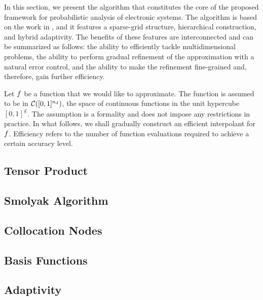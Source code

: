 In this section, we present the algorithm that constitutes the core of the
proposed framework for probabilistic analysis of electronic systems. The
algorithm is based on the work in \cite{jakeman2012, klimke2006, ma2009}, and it
features a sparse-grid structure, hierarchical construction, and hybrid
adaptivity. The benefits of these features are interconnected and can be
summarized as follows: the ability to efficiently tackle multidimensional
problems, the ability to perform gradual refinement of the approximation with a
natural error control, and the ability to make the refinement fine-grained and,
therefore, gain further efficiency.

Let $f$ be a function that we would like to approximate. The function is
assumed to be in $\mathcal{C}([0, 1]^{n_\text{d}})$, the space of continuous functions
in the unit hypercube $[0, 1]^\nin$. The assumption is a formality and does not
impose any restrictions in practice. In what follows, we shall gradually
construct an efficient interpolant for $f$. Efficiency refers to the number of
function evaluations required to achieve a certain accuracy level.

\subsection{Tensor Product} 


\subsection{Smolyak Algorithm} 



\subsection{Collocation Nodes} 



\subsection{Basis Functions} 


\subsection{Adaptivity} 



